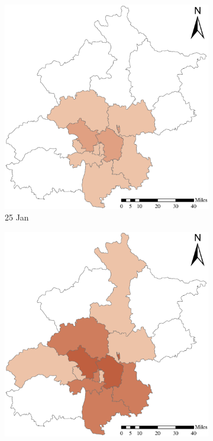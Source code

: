 \documentclass[preprints,ijgi,submit,moreauthors]{Definitions/mdpi}
\begin{document}
\begin{figure}[H]
    \centering
    \begin{subfigure}{.23\textwidth}
        \includegraphics[width=\textwidth]{Figures/ConfirmedDistrictD2020_01_25.eps}
        \caption{25 Jan}
    \end{subfigure}
    \begin{subfigure}{.23\textwidth}
        \includegraphics[width=\textwidth]{Figures/ConfirmedDistrictD2020_01_30.eps}

\end{subfigure}
\end{figure}
\end{document}
